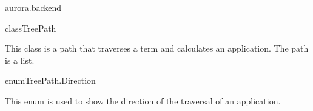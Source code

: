 \begin{texdocpackage}{aurora.backend}
\begin{texdocclass}{class}{TreePath}
\label{texdoclet:aurora.backend.TreePath}
\begin{texdocclassintro}
This class is a path that traverses a term and calculates an application.
 The path is a list.\end{texdocclassintro}
\begin{texdocclassconstructors}
\end{texdocclassconstructors}
\begin{texdocclassmethods}
\end{texdocclassmethods}
\end{texdocclass}


\begin{texdocclass}{enum}{TreePath.Direction}
\label{texdoclet:aurora.backend.TreePath.Direction}
\begin{texdocclassintro}
This enum is used to show the direction of the traversal of an application.\end{texdocclassintro}
\begin{texdocenums}
\end{texdocenums}
\begin{texdocclassmethods}
\end{texdocclassmethods}
\end{texdocclass}


\end{texdocpackage}



